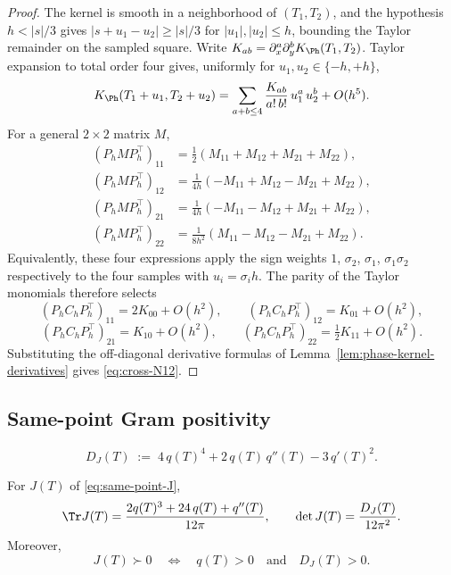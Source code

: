 \begin{proof}
The kernel is smooth in a neighborhood of \((T_1, T_2)\), and the
hypothesis \(h<|s|/3\) gives
\(|s+u_1-u_2|\ge |s|/3\) for \(|u_1|,|u_2|\le h\), bounding the
Taylor remainder on the sampled square.  Write
\(K_{ab} = \partial_x^a \partial_y^b K_\Ph(T_1, T_2)\).  Taylor
expansion to total order four gives, uniformly for
\(u_1, u_2 \in \{-h, +h\}\),
\[
K_\Ph(T_1+u_1, T_2+u_2)
= \sum_{a+b\le 4}\frac{K_{ab}}{a!\,b!}\, u_1^a\, u_2^b + O(h^5).
\]
For a general \(2\times 2\) matrix \(M\),
\begin{align*}
(P_h M P_h^\top)_{11}
&= \tfrac12(M_{11} + M_{12} + M_{21} + M_{22}),\\
(P_h M P_h^\top)_{12}
&= \tfrac{1}{4h}(-M_{11} + M_{12} - M_{21} + M_{22}),\\
(P_h M P_h^\top)_{21}
&= \tfrac{1}{4h}(-M_{11} - M_{12} + M_{21} + M_{22}),\\
(P_h M P_h^\top)_{22}
&= \tfrac{1}{8h^2}(M_{11} - M_{12} - M_{21} + M_{22}).
\end{align*}
Equivalently, these four expressions apply the sign weights
\(1\), \(\sigma_2\), \(\sigma_1\), \(\sigma_1\sigma_2\) respectively to
the four samples with \(u_i = \sigma_i h\).  The parity of the Taylor
monomials therefore selects
\[
(P_h C_h P_h^\top)_{11} = 2 K_{00} + O(h^2),\qquad
(P_h C_h P_h^\top)_{12} = K_{01} + O(h^2),
\]
\[
(P_h C_h P_h^\top)_{21} = K_{10} + O(h^2),\qquad
(P_h C_h P_h^\top)_{22} = \tfrac12 K_{11} + O(h^2).
\]
Substituting the off-diagonal derivative formulas of
Lemma~\ref{lem:phase-kernel-derivatives} gives \eqref{eq:cross-N12}.
\end{proof}

\subsection{Same-point Gram positivity}
\label{subsec:same-point-gram-positivity}

\begin{definition}
\label{def:same-point-gram-determinant}
\begin{equation}
\label{eq:same-point-gram-determinant}
D_J(T) \;:=\; 4\,q(T)^4 + 2\,q(T)\,q''(T) - 3\,q'(T)^2.
\end{equation}
\end{definition}

\begin{lemma}
\label{lem:algebraic-same-point-gram-criterion}
For \(J(T)\) of \eqref{eq:same-point-J},
\begin{equation}
\label{eq:J-trace-det}
\Tr J(T) = \frac{2 q(T)^3 + 24\,q(T) + q''(T)}{12\pi},\qquad
\det J(T) = \frac{D_J(T)}{12\pi^2}.
\end{equation}
Moreover,
\[
        J(T)\succ 0
        \quad\Longleftrightarrow\quad
        q(T) > 0 \quad\text{and}\quad D_J(T) > 0.
\]
\end{lemma}

